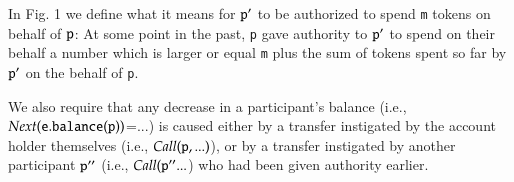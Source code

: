 \documentclass[11pt]{article}
\newcommand{\prg}[1]{{\mbox{{{\tt #1}}}}}%
\newcommand{\RoSpec}{${\cal C}hainmail$}
\begin{document}
\begin{multicols}{2}
  
 In Fig. 1 
 we  define %
 what it means for $\prg{p}'$ to be authorized to spend \prg{m} tokens on behalf of $\prg{p}$: At some point in the
past,  \prg{p} gave authority to $\prg{p}'$  to spend on their behalf  a number %
which is larger or equal   \prg{m} 
plus the sum of  tokens 
spent so far by $\prg{p}' $ on the behalf of \prg{p}. %
%

We also require that %
any decrease in  a participant's balance  %
 (i.e.,  $Next(\prg{e}.\prg{balance}(\prg{p}))$=$...$)  
is caused either by a transfer instigated by the account holder themselves (i.e., $Call(\prg{p},...)$), or by
a transfer instigated by another participant $\prg{p}''$  (i.e., $Call(\prg{p}''...$) who   had   been given authority earlier.
 
%
%
%


\end{multicols}
\end{document}
